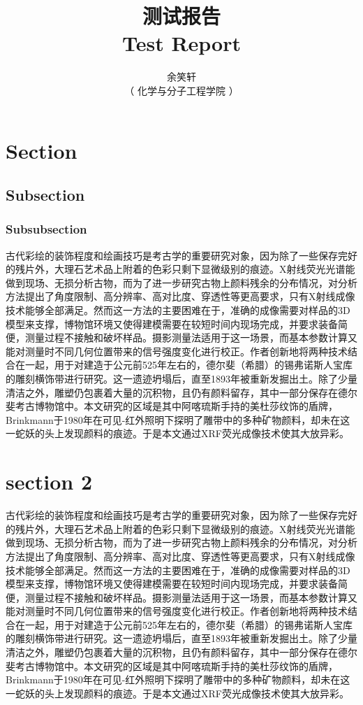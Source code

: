 \documentclass{reptemplate}
\title{
    {\heiti 测试报告}\\%
    {\fontspec{Arial} Test Report}\\%
}
\author{
    余笑轩\\%
    （ 化学与分子工程学院\qquad 1900011816 ）%
}
\date{}
\begin{document}
    \maketitle
    \section{Section}
    \subsection{Subsection}
    \subsubsection{Subsubsection}
    古代彩绘的装饰程度和绘画技巧是考古学的重要研究对象，因为除了一些保存完好的残片外，大理石艺术品上附着的色彩只剩下显微级别的痕迹。X射线荧光光谱能做到现场、无损分析古物，而为了进一步研究古物上颜料残余的分布情况，对分析方法提出了角度限制、高分辨率、高对比度、穿透性等更高要求，只有X射线成像技术能够全部满足。然而这一方法的主要困难在于，准确的成像需要对样品的3D模型来支撑，博物馆环境又使得建模需要在较短时间内现场完成，并要求装备简便，测量过程不接触和破坏样品。摄影测量法适用于这一场景，而基本参数计算又能对测量时不同几何位置带来的信号强度变化进行校正。作者创新地将两种技术结合在一起，用于对建造于公元前525年左右的，德尔斐（希腊）的锡弗诺斯人宝库的雕刻横饰带进行研究。这一遗迹坍塌后，直至1893年被重新发掘出土。除了少量清洁之外，雕塑仍包裹着大量的沉积物，且仍有颜料留存，其中一部分保存在德尔斐考古博物馆中。本文研究的区域是其中阿喀琉斯手持的美杜莎纹饰的盾牌，Brinkmann于1980年在可见-红外照明下探明了雕带中的多种矿物颜料，却未在这一蛇妖的头上发现颜料的痕迹。于是本文通过XRF荧光成像技术使其大放异彩。
    \clearpage
    \section{section 2}
    古代彩绘的装饰程度和绘画技巧是考古学的重要研究对象，因为除了一些保存完好的残片外，大理石艺术品上附着的色彩只剩下显微级别的痕迹。X射线荧光光谱能做到现场、无损分析古物，而为了进一步研究古物上颜料残余的分布情况，对分析方法提出了角度限制、高分辨率、高对比度、穿透性等更高要求，只有X射线成像技术能够全部满足。然而这一方法的主要困难在于，准确的成像需要对样品的3D模型来支撑，博物馆环境又使得建模需要在较短时间内现场完成，并要求装备简便，测量过程不接触和破坏样品。摄影测量法适用于这一场景，而基本参数计算又能对测量时不同几何位置带来的信号强度变化进行校正。作者创新地将两种技术结合在一起，用于对建造于公元前525年左右的，德尔斐（希腊）的锡弗诺斯人宝库的雕刻横饰带进行研究。这一遗迹坍塌后，直至1893年被重新发掘出土。除了少量清洁之外，雕塑仍包裹着大量的沉积物，且仍有颜料留存，其中一部分保存在德尔斐考古博物馆中。本文研究的区域是其中阿喀琉斯手持的美杜莎纹饰的盾牌，Brinkmann于1980年在可见-红外照明下探明了雕带中的多种矿物颜料，却未在这一蛇妖的头上发现颜料的痕迹。于是本文通过XRF荧光成像技术使其大放异彩。
\end{document}
